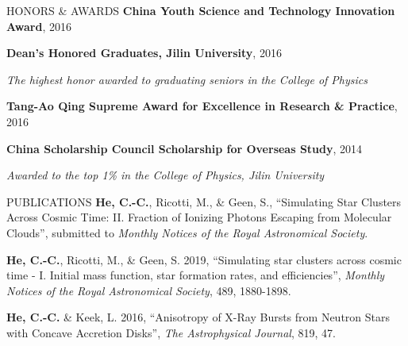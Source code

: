 \documentclass[letterpaper]{resume} %
\begin{document}


\begin{rSection}{HONORS \& AWARDS} \itemsep -3pt
{\bf China Youth Science and Technology Innovation Award}, 2016
\item {\bf Dean's Honored Graduates, Jilin University}, 2016
  \vspace{-1mm}
\item \hspace{6mm} \emph{\small The highest honor awarded to graduating
    seniors in the College of Physics}
\item {\bf Tang-Ao Qing Supreme Award for Excellence in Research \&
  Practice}, 2016
\item {\bf China Scholarship Council Scholarship for Overseas Study},
  2014
  \vspace{-1mm}
  \item \hspace{6mm} \emph{\small Awarded to the top 1\% in the College of
    Physics, Jilin University}

\end{rSection}


\begin{rSection}{PUBLICATIONS} \itemsep -3pt
  {\bf He, C.-C.}, Ricotti, M., \& Geen, S., ``Simulating Star Clusters Across Cosmic Time: II. Fraction of Ionizing Photons Escaping from Molecular Clouds'', submitted to {\it Monthly Notices of the Royal Astronomical Society}.
  \item {\bf He, C.-C.}, Ricotti, M., \& Geen, S. 2019, ``Simulating star clusters across cosmic time - I. Initial mass function, star formation rates, and efficiencies'', {\it Monthly Notices of the Royal Astronomical Society}, 489, 1880-1898.
  \item {\bf He, C.-C.} \& Keek, L. 2016, ``Anisotropy of X-Ray Bursts from Neutron Stars with Concave Accretion Disks'', {\it The Astrophysical Journal}, 819, 47.
\end{rSection}

\end{document}
